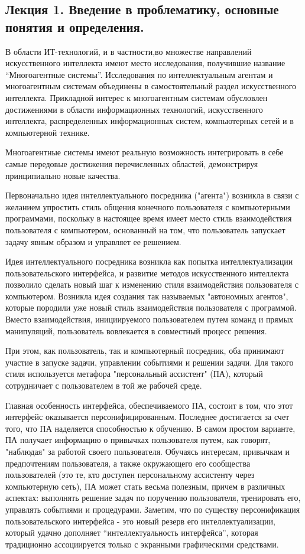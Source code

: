 \subsection*{Лекция 1. Введение в проблематику, основные понятия и определения.}

В области ИТ-технологий, и в частности,во множестве направлений искусственного интеллекта имеют место исследования, получившие название
“Многоагентные системы”. Исследования по интеллектуальным агентам и
многоагентным системам объединены в самостоятельный раздел искусственного интеллекта. Прикладной интерес к многоагентным системам обусловлен
достижениями в области информационных технологий, искусственного интеллекта, распределенных информационных систем, компьютерных сетей и в
компьютерной технике.

Многоагентные системы имеют реальную возможность интегрировать в
себе самые передовые достижения перечисленных областей, демонстрируя
принципиально новые качества. 

Первоначально идея интеллектуального посредника ("агента") возникла в связи с желанием упростить стиль общения конечного пользователя с компьютерными программами, поскольку в настоящее
время имеет место стиль взаимодействия пользователя с компьютером, основанный на том, что пользователь запускает задачу явным образом и управляет
ее решением.

Идея интеллектуального посредника возникла как попытка интеллектуализации пользовательского интерфейса, и развитие методов искусственного интеллекта позволило сделать новый шаг к изменению стиля взаимодействия пользователя с компьютером. Возникла идея создания так называемых
"автономных агентов", которые породили уже новый стиль взаимодействия
пользователя с программой. Вместо взаимодействия, инициируемого пользователем путем команд и прямых манипуляций, пользователь вовлекается в совместный процесс решения. 

При этом, как пользователь, так и компьютерный посредник, оба принимают участие в запуске задачи, управлении событиями и решении задачи.
Для такого стиля используется метафора "персональный ассистент" (ПА), который сотрудничает с пользователем в той же рабочей среде. 

Главная особенность интерфейса, обеспечиваемого ПА, состоит в том,
что этот интерфейс оказывается персонифицированным. Последнее достигается за счет того, что ПА наделяется способностью к обучению. В самом простом варианте, ПА получает информацию о привычках пользователя путем,
как говорят, "наблюдая" за работой своего пользователя. Обучаясь интересам,
привычкам и предпочтениям пользователя, а также окружающего его сообщества пользователей (это те, кто доступен персональному ассистенту через
компьютерную сеть), ПА может стать весьма полезным, причем в различных
аспектах: выполнять решение задач по поручению пользователя, тренировать
его, управлять событиями и процедурами. Заметим, что по существу персонификация пользовательского интерфейса - это новый резерв его интеллектуализации, который удачно дополняет “интеллектуальность интерфейса”, которая
традиционно ассоциируется только с экранными графическими средствами. 

